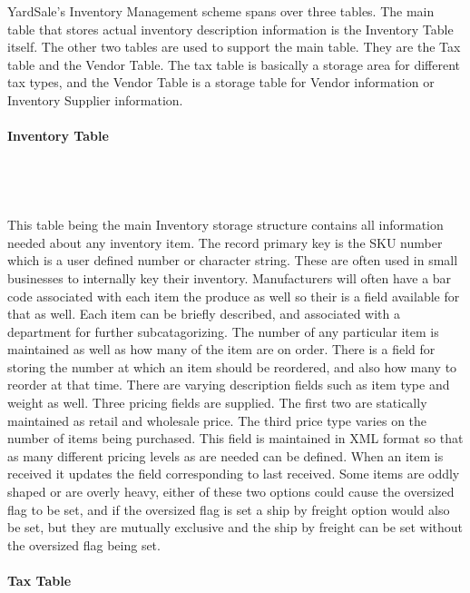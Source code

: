 \documentclass{report}
\begin{document}
    YardSale's Inventory Management scheme spans over three tables. The main table that
    stores actual inventory description information is the Inventory Table itself. The
    other two tables are used to support the main table. They are the Tax table and the
    Vendor Table. The tax table is basically a storage area for different tax types, and
    the Vendor Table is a storage table for Vendor information or Inventory Supplier
    information.\\
    \\
    {\bf Inventory Table}\\
    \\
    \\
    \\
    \\
    This table being the main Inventory storage structure contains all information needed
    about any inventory item. The record primary key is the SKU number which is a user
    defined number or character string. These are often used in small businesses to
    internally key their inventory. Manufacturers will often have a bar code associated
    with each item the produce as well so their is a field available for that as well.
    Each item can be briefly described, and associated with a department for further
    subcatagorizing. The number of any particular item is maintained as well as how many
    of the item are on order. There is a field for storing the number at which an item should
    be reordered, and also how many to reorder at that time. There are varying description
    fields such as item type and weight as well. Three pricing fields are supplied. The
    first two are statically maintained as retail and wholesale price. The third price
    type varies on the number of items being purchased. This field is maintained in XML
    format so that as many different pricing levels as are needed can be defined. When an
    item is received it updates the field corresponding to last received. Some items are
    oddly shaped or are overly heavy, either of these two options could cause the oversized
    flag to be set, and if the oversized flag is set a ship by freight option would also be
    set, but they are mutually exclusive and the ship by freight can be set without the
    oversized flag being set.\\
    \\
    {\bf Tax Table}\\
    \\
\end{document}
